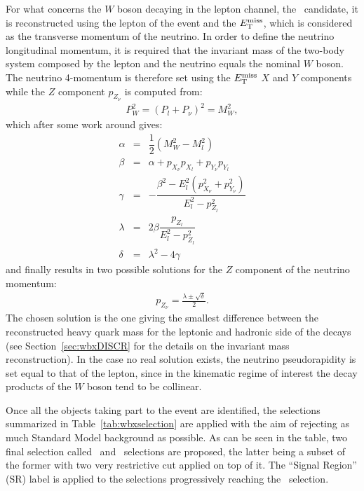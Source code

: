 For what concerns the $W$ boson decaying in the lepton channel, the \wlep\ candidate,
it is reconstructed using the lepton of the event and the $\met$, 
which is considered as the transverse momentum of the neutrino. 
In order to define the neutrino longitudinal momentum, it is required that
the invariant mass of the two-body system composed by the lepton and the neutrino 
equals the nominal $W$ boson. 
The neutrino 4-momentum is therefore set using the $\met$ $X$ and $Y$ components
while the $Z$ component $p_{Z_\nu}$ is computed from: 
\begin{eqnarray}
P_W^2 = (P_l + P_{\nu})^2 = M_W^2,
\end{eqnarray}
which after some work around gives:
\begin{eqnarray}
\alpha &=& \dfrac{1}{2}(M_W^2 - M_l^2) \\
\beta  &=& \alpha + p_{X_\nu}p_{X_l} + p_{Y_\nu}p_{Y_l} \\
\gamma &=& -\dfrac{\beta^2 - E_l^2 (p_{X_\nu}^2+p_{Y_\nu}^2)}{E_l^2-p_{Z_l}^2} \\
\lambda &=& 2\beta \dfrac{p_{Z_l}}{E_l^2-p_{Z_l}^2}\\
\delta  &=& \lambda^2 - 4\gamma
\end{eqnarray}
and finally results in two possible solutions for the 
$Z$ component of the neutrino momentum:
\begin{eqnarray}
p_{Z_\nu} = \frac{\lambda \pm \sqrt{\delta} }{2}.
\end{eqnarray}
The chosen solution is the one giving
the smallest difference between the reconstructed 
heavy quark mass for the
leptonic and hadronic side of the decays (see Section~\ref{sec:wbxDISCR} 
for the details on the invariant mass reconstruction).
In the case no real solution exists, the neutrino pseudorapidity 
is set equal to that of the lepton, since in the kinematic regime of interest  
the decay products of the $W$ boson tend to be collinear.

Once all the objects taking part to the event are identified,
the selections summarized in Table~\ref{tab:wbxselection} are
applied with the aim of rejecting as much Standard Model background
as possible. As can be seen in the table, two final selection called
\loose\ and \tight\ selections are proposed, the latter being a
subset of the former with two very restrictive cut applied on top of it.
The ``Signal Region'' (SR) label is applied to the selections
progressively reaching the \tight\ selection.

